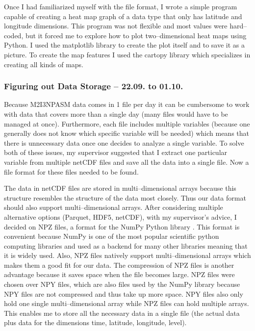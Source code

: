 \documentclass[../00_main.tex]{subfiles}
\begin{document}
Once I had familiarized myself with the file format, I wrote a simple program 
capable of creating a heat map graph of a data type that only has latitude and
longitude dimensions. This program was not flexible and most values were
hard--coded, but it forced me to explore how to plot two--dimensional heat maps
using Python. I used the matplotlib library \cite{py-mpl} to create the plot 
itself and to save it as a picture. To create the map features I used the
cartopy library \cite{py-cartopy} which specializes in creating all kinds of 
maps.

\subsubsection{Figuring out Data Storage -- 22.09. to 01.10.}

Because M2I3NPASM data comes in 1 file per day it can be cumbersome to work
with data that covers more than a single day (many files would have to be 
managed at once). Furthermore, each file includes multiple variables (because 
one generally does not know which specific variable will be needed) which means
that there is unnecessary data once one decides to analyze a single variable.
To solve both of these issues, my supervisor suggested that I extract one
particular variable from multiple netCDF files and save all the data into
a single file. Now a file format for these files needed to be found.\newline

The data in netCDF files are stored in multi--dimensional arrays because this
structure resembles the structure of the data most closely. Thus our data
format should also support multi--dimensional arrays. After considering 
multiple alternative options (Parquet, HDF5, netCDF), with my supervisor's 
advice, I decided on NPZ files, a format for the NumPy Python library 
\cite{py-numpy}. This format is convenient because NumPy is one of the most 
popular scientific python computing libraries and used as a backend for 
many other libraries meaning that it is widely used. Also, NPZ files natively
support multi--dimensional arrays which makes them a good fit for our data. 
The compression of NPZ files is another advantage because it saves space when 
the file becomes large. NPZ files were chosen over NPY files, which are also 
files used by the NumPy library because NPY files are not compressed 
and thus take up more space. NPY files also only hold one single 
multi--dimensional array while NPZ files can hold multiple arrays. This enables
me to store all the necessary data in a single file (the actual data plus data
for the dimensions time, latitude, longitude, level).\newline
\end{document}
